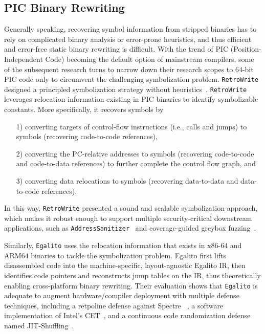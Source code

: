 \subsection{PIC Binary Rewriting} \label{sec:existing-pic}
Generally speaking, recovering symbol information from stripped binaries has to rely on complicated binary analysis or error-prone heuristics, and thus efficient and error-free static binary rewriting is difficult. With the trend of PIC (Position-Independent Code) becoming the default option of mainstream compilers, some of the subsequent research turns to narrow down their research scopes to 64-bit PIC code only to circumvent the challenging symbolization problem.
\texttt{RetroWrite} designed a principled symbolization strategy without heuristics~\cite{dinesh2020retrowrite}. \texttt{RetroWrite} leverages relocation information existing in PIC binaries to identify symbolizable constants. More specifically, it recovers symbols by
\begin{itemize}
  \item[1)] converting targets of control-flow instructions (i.e., calls and jumps) to symbols (recovering code-to-code references),
  \item[2)] converting the PC-relative addresses to symbols (recovering code-to-code and code-to-data references) to further complete the control flow graph, and
  \item[3)] converting data relocations to symbols (recovering data-to-data and data-to-code references).
\end{itemize}

In this way, \texttt{RetroWrite} presented a sound and scalable symbolization approach, which makes it robust enough to support multiple security-critical downstream applications, such as \texttt{AddressSanitizer}~\cite{serebryany2012addresssanitizer} and coverage-guided greybox fuzzing~\cite{zalewski2014american}.

Similarly, \texttt{Egalito} uses the relocation information that exists in x86-64 and ARM64 binaries to tackle the symbolization problem. Egalito first lifts disassembled code into the machine-specific, layout-agnostic Egalito IR, then identifies code pointers and reconstructs jump tables on the IR, thus theoretically enabling cross-platform binary rewriting. Their evaluation shows that \texttt{Egalito} is adequate to augment hardware/compiler deployment with multiple defense techniques, including a retpoline defense against Spectre ~\cite{kocher2019spectre}, a software implementation of Intel’s CET~\cite{cet}, and a continuous code randomization defense named JIT-Shuffling~\cite{williams2016shuffler}.

